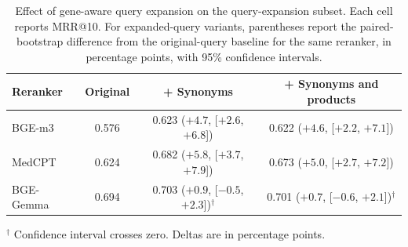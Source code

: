 \documentclass[runningheads]{llncs}
\begin{document}
\FloatBarrier

\begin{table}[H]
\centering
\caption{Effect of gene-aware query expansion on the query-expansion subset. Each cell reports MRR@10. For expanded-query variants, parentheses report the paired-bootstrap difference from the original-query baseline for the same reranker, in percentage points, with 95\% confidence intervals.}
\label{tab:s1_qe_reranker}
\scriptsize
\setlength{\tabcolsep}{4pt}
\begin{tabular}{@{}l c c c@{}}
\toprule
Reranker & Original & + Synonyms & + Synonyms and products \\
\midrule
BGE-m3 & 0.576 & 0.623 ($+4.7$, [$+2.6$, $+6.8$]) & 0.622 ($+4.6$, [$+2.2$, $+7.1$]) \\
MedCPT & 0.624 & 0.682 ($+5.8$, [$+3.7$, $+7.9$]) & 0.673 ($+5.0$, [$+2.7$, $+7.2$]) \\
BGE-Gemma & 0.694 & 0.703 ($+0.9$, [$-0.5$, $+2.3$])$^{\dag}$ & 0.701 ($+0.7$, [$-0.6$, $+2.1$])$^{\dag}$ \\
\bottomrule
\end{tabular}

\vspace{1mm}
{\scriptsize $^{\dag}$ Confidence interval crosses zero. Deltas are in percentage points.}
\end{table}

\begin{table}[H]
\centering
\caption{First-stage Recall@1000 and post-rerank MRR@10 (BGE-m3) by
abstract-evidence level, shown for the has-PDF subset
(Fig.~\ref{fig:evidence_haspdf}) and for the full 1,656-query dataset with
partial full-text coverage. Full-dataset gains are diluted because some cited
PMIDs lack chunked-corpus coverage, but the qualitative pattern is unchanged.}
\label{tab:s2_evidence_haspdf_full}
\scriptsize
\setlength{\tabcolsep}{4pt}
\end{table}
\end{document}
